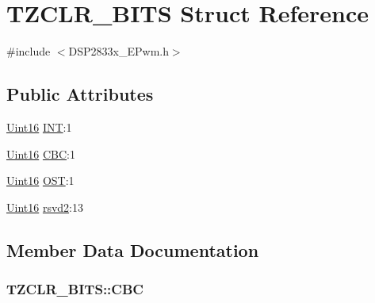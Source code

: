 \hypertarget{struct_t_z_c_l_r___b_i_t_s}{}\section{T\+Z\+C\+L\+R\+\_\+\+B\+I\+T\+S Struct Reference}
\label{struct_t_z_c_l_r___b_i_t_s}


{\ttfamily \#include $<$D\+S\+P2833x\+\_\+\+E\+Pwm.\+h$>$}

\subsection*{Public Attributes}
\begin{DoxyCompactItemize}
\item 
\hyperlink{_d_s_p2833x___device_8h_a59a9f6be4562c327cbfb4f7e8e18f08b}{Uint16} \hyperlink{struct_t_z_c_l_r___b_i_t_s_a66629d4927224c2e5ba60a8bb8c6398b}{I\+N\+T}\+:1
\item 
\hyperlink{_d_s_p2833x___device_8h_a59a9f6be4562c327cbfb4f7e8e18f08b}{Uint16} \hyperlink{struct_t_z_c_l_r___b_i_t_s_a7e94424e5e2620115e7ed0bf0b15189b}{C\+B\+C}\+:1
\item 
\hyperlink{_d_s_p2833x___device_8h_a59a9f6be4562c327cbfb4f7e8e18f08b}{Uint16} \hyperlink{struct_t_z_c_l_r___b_i_t_s_ac62fe9e0268c55533748b592b1895aa1}{O\+S\+T}\+:1
\item 
\hyperlink{_d_s_p2833x___device_8h_a59a9f6be4562c327cbfb4f7e8e18f08b}{Uint16} \hyperlink{struct_t_z_c_l_r___b_i_t_s_a5d5275ffe47f3553720648c9dce9dacf}{rsvd2}\+:13
\end{DoxyCompactItemize}


\subsection{Member Data Documentation}
\hypertarget{struct_t_z_c_l_r___b_i_t_s_a7e94424e5e2620115e7ed0bf0b15189b}{}
\subsubsection[{C\+B\+C}]{ T\+Z\+C\+L\+R\+\_\+\+B\+I\+T\+S\+::\+C\+B\+C}\label{struct_t_z_c_l_r___b_i_t_s_a7e94424e5e2620115e7ed0bf0b15189b}
\hypertarget{struct_t_z_c_l_r___b_i_t_s_a66629d4927224c2e5ba60a8bb8c6398b}{}

